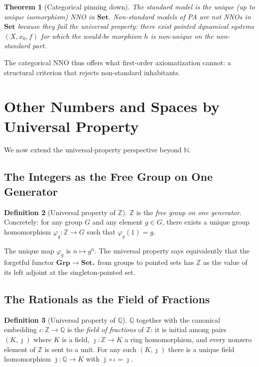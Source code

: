 \documentclass[12pt]{article}
\newtheorem{theorem}{Theorem}[section]
\theoremstyle{definition}
\newtheorem{definition}[theorem]{Definition}
\theoremstyle{remark}
\newcommand{\N}{\mathbb{N}}
\newcommand{\Z}{\mathbb{Z}}
\newcommand{\Q}{\mathbb{Q}}
\newcommand{\Set}{\mathbf{Set}}
\begin{document}
\begin{theorem}[Categorical pinning down]
\label{thm:standard-model}
The standard model is the unique (up to unique isomorphism) NNO in $\Set$. Non-standard models of PA are not NNOs in $\Set$ because they fail the universal property: there exist pointed dynamical systems $(X, x_0, f)$ for which the would-be morphism $h$ is non-unique on the non-standard part.
\end{theorem}

The categorical NNO thus offers what first-order axiomatization cannot: a structural criterion that rejects non-standard inhabitants.

\section{Other Numbers and Spaces by Universal Property}
\label{sec:transcendentals}

We now extend the universal-property perspective beyond $\N$.

\subsection{The Integers as the Free Group on One Generator}

\begin{definition}[Universal property of $\Z$]
$\Z$ is the \emph{free group on one generator}. Concretely: for any group $G$ and any element $g \in G$, there exists a unique group homomorphism $\varphi_g \colon \Z \to G$ such that $\varphi_g(1) = g$.
\end{definition}

The unique map $\varphi_g$ is $n \mapsto g^n$. The universal property says equivalently that the forgetful functor $\mathbf{Grp} \to \Set_*$ from groups to pointed sets has $\Z$ as the value of its left adjoint at the singleton-pointed set.

\subsection{The Rationals as the Field of Fractions}

\begin{definition}[Universal property of $\Q$]
\label{def:Q-up}
$\Q$ together with the canonical embedding $\iota \colon \Z \to \Q$ is the \emph{field of fractions} of $\Z$: it is initial among pairs $(K, \jmath)$ where $K$ is a field, $\jmath \colon \Z \to K$ a ring homomorphism, and every nonzero element of $\Z$ is sent to a unit. For any such $(K, \jmath)$ there is a unique field homomorphism $\bar{\jmath} \colon \Q \to K$ with $\bar{\jmath} \circ \iota = \jmath$.
\end{definition}
\end{document}

